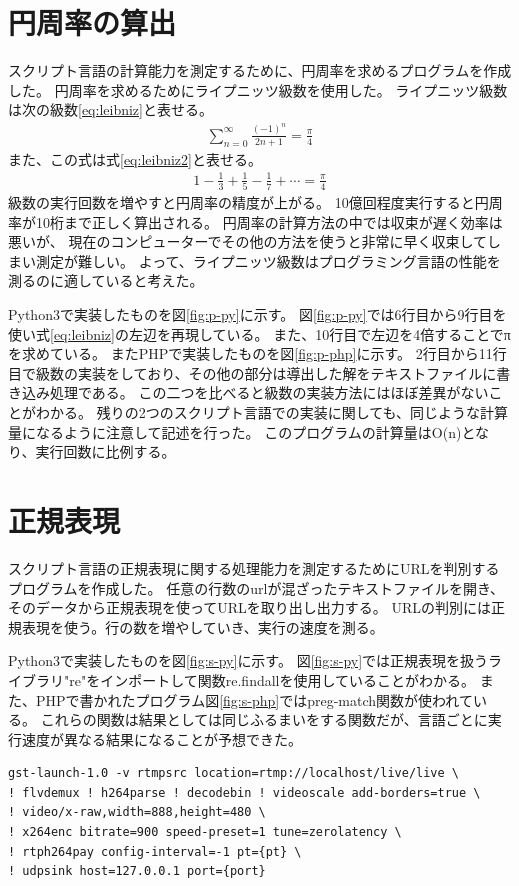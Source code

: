 \section{円周率の算出}
スクリプト言語の計算能力を測定するために、円周率を求めるプログラムを作成した。
円周率を求めるためにライプニッツ級数を使用した。
ライプニッツ級数は次の級数\ref{eq:leibniz}と表せる。
\begin{eqnarray} \label{eq:leibniz}
\sum_{n=0}^{\infty}\frac{(-1)^n}{2n+1}=\frac{\pi}{4}
\end{eqnarray}
また、この式は式\ref{eq:leibniz2}と表せる。
\begin{eqnarray} \label{eq:leibniz2}
1-\frac{1}{3}+\frac{1}{5}-\frac{1}{7}+\cdots=\frac{\pi}{4}
\end{eqnarray}
級数の実行回数を増やすと円周率の精度が上がる。
10億回程度実行すると円周率が10桁まで正しく算出される。
円周率の計算方法の中では収束が遅く効率は悪いが、
現在のコンピューターでその他の方法を使うと非常に早く収束してしまい測定が難しい。
よって、ライプニッツ級数はプログラミング言語の性能を測るのに適していると考えた。

Python3で実装したものを図\ref{fig:p-py}に示す。
図\ref{fig:p-py}では6行目から9行目を使い式\ref{eq:leibniz}の左辺を再現している。
また、10行目で左辺を4倍することでπを求めている。
またPHPで実装したものを図\ref{fig:p-php}に示す。
2行目から11行目で級数の実装をしており、その他の部分は導出した解をテキストファイルに書き込み処理である。
この二つを比べると級数の実装方法にはほぼ差異がないことがわかる。
残りの2つのスクリプト言語での実装に関しても、同じような計算量になるように注意して記述を行った。
このプログラムの計算量はO(n)となり、実行回数に比例する。

\section{正規表現}
スクリプト言語の正規表現に関する処理能力を測定するためにURLを判別するプログラムを作成した。
任意の行数のurlが混ざったテキストファイルを開き、そのデータから正規表現を使ってURLを取り出し出力する。
URLの判別には正規表現を使う。行の数を増やしていき、実行の速度を測る。

Python3で実装したものを図\ref{fig:s-py}に示す。
図\ref{fig:s-py}では正規表現を扱うライブラリ"re"をインポートして関数re.findallを使用していることがわかる。
また、PHPで書かれたプログラム図\ref{fig:s-php}ではpreg-match関数が使われている。
これらの関数は結果としては同じふるまいをする関数だが、言語ごとに実行速度が異なる結果になることが予想できた。

\begin{lstlisting}[label={prg:gst}, caption={GStreamer コマンドライン}, basicstyle=\ttfamily\footnotesize, frame=single]
gst-launch-1.0 -v rtmpsrc location=rtmp://localhost/live/live \
! flvdemux ! h264parse ! decodebin ! videoscale add-borders=true \
! video/x-raw,width=888,height=480 \
! x264enc bitrate=900 speed-preset=1 tune=zerolatency \
! rtph264pay config-interval=-1 pt={pt} \
! udpsink host=127.0.0.1 port={port}
\end{lstlisting}

